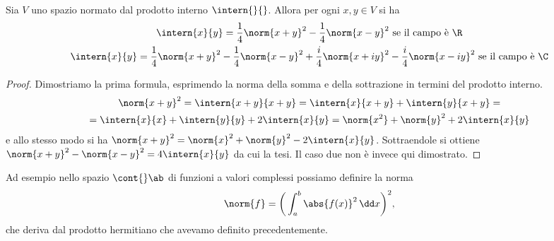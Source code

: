 \begin{proprieta} \label{p:formule-polarizzazione}
	Sia $V$ uno spazio normato dal prodotto interno $\intern{}{}$.
	Allora per ogni $  x,  y\in V$ si ha
	\begin{gather}
		\intern{  x}{  y}=\frac14\norm{  x+  y}^2-\frac14\norm{  x-  y}^2\text{ se il campo è }\R
		\label{eq:polarizzazione-R}\\
		\intern{  x}{  y}=\frac14\norm{  x+  y}^2-\frac14\norm{  x-  y}^2+\frac{i}4\norm{  x+i  y}^2-\frac{i}4\norm{  x-i  y}^2\text{ se il campo è }\C
		\label{eq:polarizzazione-C}
	\end{gather}
\end{proprieta}
\begin{proof}
	Dimostriamo la prima formula, esprimendo la norma della somma e della sottrazione in termini del prodotto interno.
	\begin{multline*}
		\norm{  x+  y}^2=\intern{  x+  y}{  x+  y}=\intern{  x}{  x+  y}+\intern{  y}{  x+  y}=\\
		=\intern{  x}{  x}+\intern{  y}{  y}+2\intern{  x}{  y}=\norm{  x^2}+\norm{  y}^2+2\intern{  x}{  y}
	\end{multline*}
	e allo stesso modo si ha $\norm{  x+  y}^2=\norm{  x}^2+\norm{  y}^2-2\intern{  x}{  y}$.
	Sottraendole si ottiene $\norm{  x+  y}^2-\norm{  x-  y}^2=4\intern{  x}{  y}$ da cui la tesi. Il caso due non è invece qui dimostrato.
\end{proof}
Ad esempio nello spazio $\cont{}\ab$ di funzioni a valori complessi possiamo definire la norma
\begin{equation*}
	\norm{f}=\bigg(\int_a^b\abs{f(x)}^2\,\dd x\bigg)^2,
\end{equation*}
che deriva dal prodotto hermitiano che avevamo definito precedentemente.

